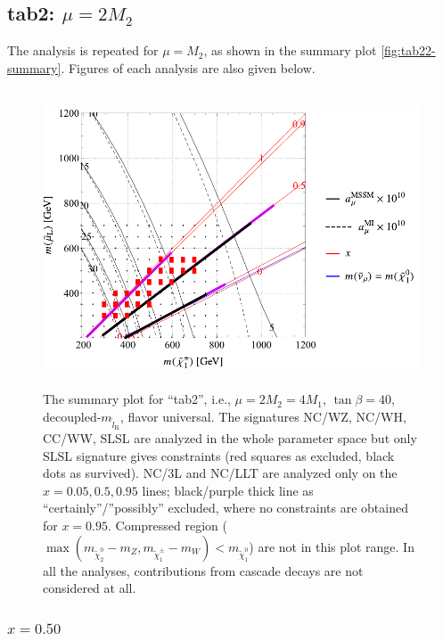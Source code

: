 \documentclass[a4paper,10pt,captions=tableheading,DIV=14]{scrartcl}
\numberwithin{equation}{section}
\newcommand\w[1]{_{\mathrm{#1}}}
\newcommand\neut  [1][\relax]{{\tilde\chi^0_{#1}}}
\newcommand\charPM[1][\relax]{{\tilde\chi^\pm_{#1}}}
\begin{document}
\clearpage
\subsection[tab2:mu=2M2]{tab2: $\mu=2M_2$}
The analysis is repeated for $\mu=M_2$, as shown in the summary plot \cref{fig:tab22-summary}.
Figures of each analysis are also given below.

\begin{figure}[h]\centering
  \includegraphics[height=250pt]{mueq2m2.pdf}
  \caption{\label{fig:tab2-summary}The summary plot for ``tab2'', i.e.,
 $\mu=2M_2=4M_1$, $\tan\beta=40$, decoupled-$m_{\tilde l\w R}$, flavor universal.
 The signatures NC/WZ, NC/WH, CC/WW, SLSL are analyzed in the whole parameter space but only SLSL signature gives constraints (red squares as excluded, black dots as survived).
 NC/3L and NC/LLT are analyzed only on the $x=0.05, 0.5, 0.95$ lines; black/purple thick line as ``certainly''/''possibly'' excluded, where no constraints are obtained for $x=0.95$.
 Compressed region ($\max(m_{\neut[2]}-m_Z,m_{\charPM[1]}-m_W)<m_{\neut[1]}$) are not in this plot range.
 In all the analyses, contributions from cascade decays are not considered at all.
}
\end{figure}


\subsubsection{$x=0.50$}
\end{document}

